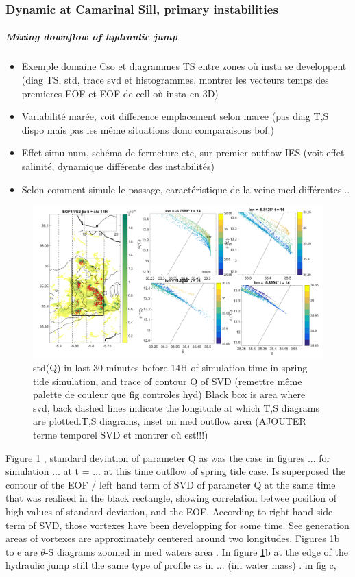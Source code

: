 \subsubsection{Dynamic at Camarinal Sill, primary instabilities}

\subparagraph{Mixing downflow of hydraulic jump}
\begin{itemize}
	\item Exemple domaine Cso et diagrammes TS entre zones où insta se developpent (diag TS, std, trace svd et histogrammes, montrer les vecteurs temps des premieres EOF et EOF de cell où insta en 3D)
	\item Variabilité marée, voit difference emplacement selon maree (pas diag T,S dispo mais pas les même situations donc comparaisons bof.)
	\item Effet simu num, schéma de fermeture etc, sur premier outflow IES (voit effet salinité, dynamique différente des instabilités)
	\item Selon comment simule le passage, caractéristique de la veine med différentes...
\end{itemize}

\begin{figure}[!h]
 \includegraphics[width=\textwidth]{./GBR3D/TS_coupes_14H_VE2o.png}
 \caption {std(Q) in last 30 minutes before 14H of simulation time in spring tide simulation, and trace of contour Q of SVD (remettre même palette de couleur que fig controles hyd) Black box is area where svd, back dashed lines indicate the longitude at which T,S diagrams are plotted.T,S diagrams, inset on med outflow area (AJOUTER terme temporel SVD et montrer où est!!!)}
 \label{FigTSCS}
\end{figure}


Figure \ref{FigTSCS} , standard deviation of parameter Q as was the case in figures ... for simulation ... at t = ... at this time outflow of spring tide case. Is superposed the contour of the EOF / left hand term of SVD of parameter Q at the same time that was realised in the black rectangle, showing correlation betwee position of high values of standard deviation, and the EOF. According to right-hand side term of SVD, those vortexes have been developping for some time. See generation areas of vortexes are approximately centered around two longitudes. Figures \ref{FigTSCS}b to e are $\theta$-S diagrams zoomed in med waters area . In figure \ref{FigTSCS}b at the edge of the hydraulic jump still the same type of profile as in ... (ini water mass)  . in fig c, 





